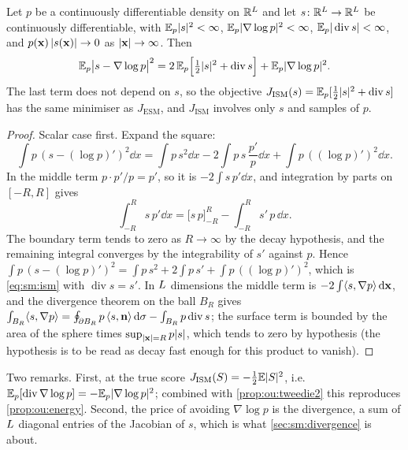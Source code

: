 \begin{theorem}
\label{thm:sm:ism}
Let $p$ be a continuously differentiable density on $\mathbb{R}^{L}$ and let
$s\colon\mathbb{R}^{L}\to\mathbb{R}^{L}$ be continuously differentiable, with
$\mathbb{E}_p|s|^2<\infty$, $\mathbb{E}_p|\nabla\log p|^2<\infty$, $\mathbb{E}_p|\operatorname{div}s|<\infty$,
and $p(\mathbf{x})\,|s(\mathbf{x})|\to0$ as $|\mathbf{x}|\to\infty$. Then
\begin{equation}
  \mathbb{E}_p\bigl|s-\nabla\log p\bigr|^2
  =2\,\mathbb{E}_p\Bigl[\tfrac12|s|^2+\operatorname{div}s\Bigr]+\mathbb{E}_p|\nabla\log p|^2 .
  \label{eq:sm:ism}
\end{equation}
The last term does not depend on $s$, so the  objective
$J_{\mathrm{ISM}}(s)=\mathbb{E}_p[\tfrac12|s|^2+\operatorname{div}s]$ has the same minimiser as
$J_{\mathrm{ESM}}$, and $J_{\mathrm{ISM}}$ involves only $s$ and samples of $p$.
\end{theorem}

\begin{proof}
Scalar case first. Expand the square:
\[
  \int p\,(s-(\log p)')^2\dd x=\int p\,s^2\dd x-2\int p\,s\,\frac{p'}{p}\dd x+\int p\,((\log p)')^2\dd x .
\]
In the middle term $p\cdot p'/p=p'$, so it is $-2\int s\,p'\dd x$, and integration by
parts on $[-R,R]$ gives
\[
  \int_{-R}^{R}s\,p'\dd x=\bigl[s\,p\bigr]_{-R}^{R}-\int_{-R}^{R}s'\,p\,\dd x .
\]
The boundary term tends to zero as $R\to\infty$ by the decay hypothesis, and the
remaining integral converges by the integrability of $s'$ against $p$. Hence
$\int p\,(s-(\log p)')^2=\int p\,s^2+2\int p\,s'+\int p\,((\log p)')^2$, which is
\cref{eq:sm:ism} with $\operatorname{div}s=s'$. In $L$ dimensions the middle term is
$-2\int\langle s,\nabla p\rangle\,\mathrm{d}\mathbf{x}$, and the divergence theorem on the ball $B_R$
gives $\int_{B_R}\langle s,\nabla p\rangle=\oint_{\partial B_R}p\,\langle s,\mathbf{n}\rangle\,\mathrm{d}\sigma-\int_{B_R}p\operatorname{div}s$;
the surface term is bounded by the area of the sphere times $\sup_{|\mathbf{x}|=R}p|s|$, which
tends to zero by hypothesis (the hypothesis is to be read as decay fast enough for
this product to vanish).
\end{proof}

Two remarks. First, at the true score $J_{\mathrm{ISM}}(S)=-\tfrac12\mathbb{E}|S|^2$,
i.e.\ $\mathbb{E}_p[\operatorname{div}\nabla\log p]=-\mathbb{E}_p|\nabla\log p|^2$; combined with
\cref{prop:ou:tweedie2} this reproduces \cref{prop:ou:energy}. Second, the price of
avoiding $\nabla\log p$ is the divergence, a sum of $L$ diagonal entries of the
Jacobian of $s$, which is what \cref{sec:sm:divergence} is about.

